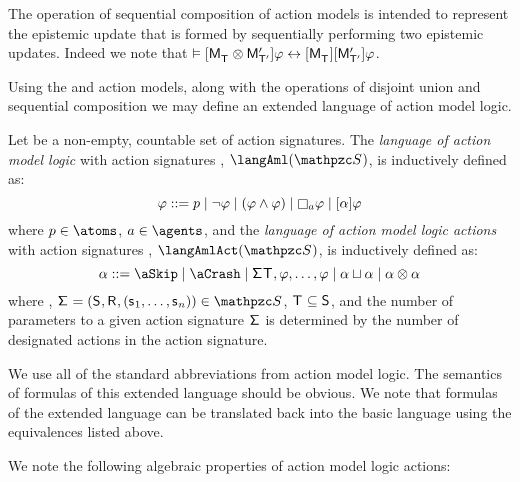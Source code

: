 The operation of sequential composition of action models is intended to represent the epistemic update that is formed by sequentially performing two epistemic updates.
Indeed we note that $\entails \actionA{\aPModel{\aStatesT} \compose \aPModelP{\aStatesTP}} \phi \iff \actionA{\aPModel{\aStatesT}} \actionA{\aPModelP{\aStatesTP}} \phi$.

Using the \aSkip{} and \aCrash{} action models, along with the operations of disjoint union and sequential composition we may define an extended language of action model logic.

\begin{definition}
Let \aSignatureFamily{} be a non-empty, countable set of action signatures.
The {\em language of action model logic} with action signatures \aSignatureFamily{}, $\langAml(\aSignatureFamily)$, is inductively defined as:
$$
\phi ::=
    \atomP \mid
    \lnot \phi \mid
    (\phi \land \phi) \mid
    \necessaryA \phi \mid
    \actionA{\alpha} \phi
$$
where $\atomP \in \atoms$, $\agentA \in \agents$, and the {\em language of action model logic actions} with action signatures \aSignatureFamily{}, $\langAmlAct(\aSignatureFamily)$, is inductively defined as:
$$
\alpha ::=
    \aSkip \mid
    \aCrash \mid
    \aSignature \aStatesT, \phi, \dots, \phi \mid
    \alpha \choice \alpha \mid
    \alpha \compose \alpha
$$
where , $\aSignatureAndTuple \in \aSignatureFamily$, $\aStatesT \subseteq \aStates$, and the number of parameters to a given action signature $\aSignature$ is determined by the number of designated actions in the action signature.
\end{definition}

We use all of the standard abbreviations from action model logic.
The semantics of formulas of this extended language should be obvious.
We note that formulas of the extended language can be translated back into the basic language using the equivalences listed above.

We note the following algebraic properties of action model logic actions:

